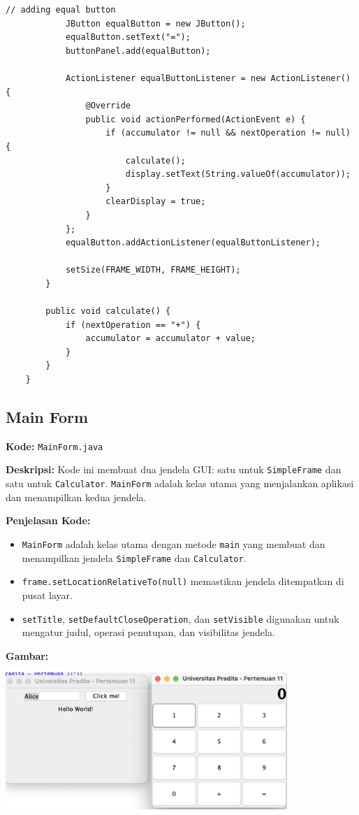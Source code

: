 \begin{lstlisting}[style=JavaStyle]
			// adding equal button
			JButton equalButton = new JButton();
			equalButton.setText("=");
			buttonPanel.add(equalButton);
			
			ActionListener equalButtonListener = new ActionListener() {
				@Override
				public void actionPerformed(ActionEvent e) {
					if (accumulator != null && nextOperation != null) {
						calculate();
						display.setText(String.valueOf(accumulator));
					}
					clearDisplay = true;
				}
			};
			equalButton.addActionListener(equalButtonListener);
			
			setSize(FRAME_WIDTH, FRAME_HEIGHT);
		}
		
		public void calculate() {
			if (nextOperation == "+") {
				accumulator = accumulator + value;
			}
		}
	}
\end{lstlisting}






\subsection{Main Form}

\textbf{Kode:} \texttt{MainForm.java}

\textbf{Deskripsi:} Kode ini membuat dua jendela GUI: satu untuk \texttt{SimpleFrame} dan satu untuk \texttt{Calculator}. \texttt{MainForm} adalah kelas utama yang menjalankan aplikasi dan menampilkan kedua jendela.

\textbf{Penjelasan Kode:}
\begin{itemize}
	\item \texttt{MainForm} adalah kelas utama dengan metode \texttt{main} yang membuat dan menampilkan jendela \texttt{SimpleFrame} dan \texttt{Calculator}.
	\item \texttt{frame.setLocationRelativeTo(null)} memastikan jendela ditempatkan di pusat layar.
	\item \texttt{setTitle}, \texttt{setDefaultCloseOperation}, dan \texttt{setVisible} digunakan untuk mengatur judul, operasi penutupan, dan visibilitas jendela.
\end{itemize}

\textbf{Gambar:} \\
\begin{center}
	\includegraphics[width=0.8\textwidth]{assets/pertemuan11/main_form.png}
\end{center}

